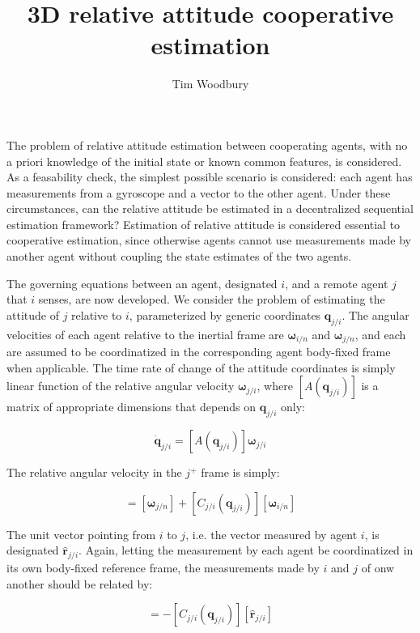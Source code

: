 \documentclass{aiaa-tc}
\title{ 3D relative attitude cooperative estimation }
\author{Tim Woodbury}
\newcommand{\fr}[1]{$#1^+$} %
\newcommand{\B}[1]{\textbf{#1}} %
\newcommand{\U}[1]{\hat{\textbf{#1}}} %
\newcommand{\BG}[1]{{\bm #1}}           %
\begin{document}
\maketitle

The problem of relative attitude estimation between cooperating agents, with no a priori knowledge of the initial state or known common features, is considered. As a feasability check, the simplest possible scenario is considered: each agent has measurements from a gyroscope and a vector to the other agent. Under these circumstances, can the relative attitude be estimated in a decentralized sequential estimation framework? Estimation of relative attitude is considered essential to cooperative estimation, since otherwise agents cannot use measurements made by another agent without coupling the state estimates of the two agents.

The governing equations between an agent, designated $i$, and a remote agent $j$ that $i$ senses, are now developed. We consider the problem of estimating the attitude of $j$ relative to $i$, parameterized by generic coordinates $\B{q}_{j/i}$. The angular velocities of each agent relative to the inertial frame are $\BG{\omega}_{i/n}$ and $\BG{\omega}_{j/n}$, and each are assumed to be coordinatized in the corresponding agent body-fixed frame when applicable. The time rate of change of the attitude coordinates is simply linear function of the relative angular velocity $\BG{\omega}_{j/i}$, where $[A(\B{q}_{j/i})]$ is a matrix of appropriate dimensions that depends on $\B{q}_{j/i}$ only:

\begin{equation}
\dot{\B{q}}_{j/i} = [A(\B{q}_{j/i})]\BG{\omega}_{j/i}
\label{eq:qji}
\end{equation}

The relative angular velocity in the \fr{j} frame is simply:

\begin{equation}
[\BG{\omega}_{j/i}] = [\BG{\omega}_{j/n}] + [C_{j/i}(\B{q}_{j/i})][\BG{\omega}_{i/n}]
\label{eq:omegaji}
\end{equation}

The unit vector pointing from $i$ to $j$, i.e. the vector measured by agent $i$, is designated $\U{r}_{j/i}$. Again, letting the measurement by each agent be coordinatized in its own body-fixed reference frame, the measurements made by $i$ and $j$ of onw another should be related by:

\begin{equation}
[\U{r}_{i/j}] = -[C_{j/i}(\B{q}_{j/i})][\U{r}_{j/i}]
\label{eq:rijtemp}
\end{equation}
\end{document}
